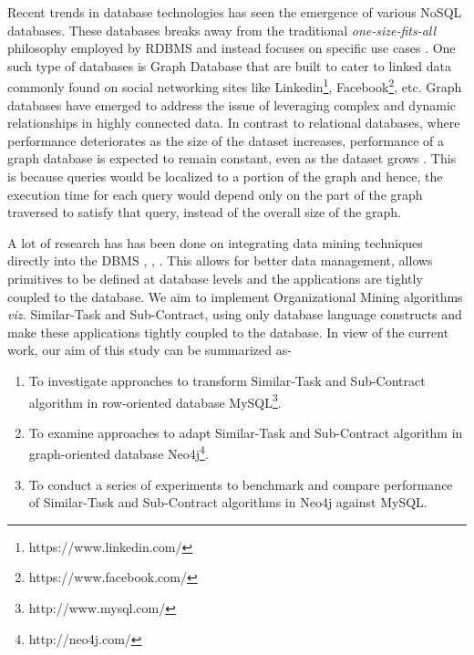 \documentclass[11pt]{article}
\begin{document}
\par{Recent trends in database technologies has seen the emergence of various NoSQL databases. These databases breaks away from the traditional \textit{one-size-fits-all} philosophy employed by RDBMS and instead focuses on specific use cases \cite{one}. One such type of databases is Graph Database that are built to cater to linked data commonly found on social networking sites like Linkedin\footnote{https://www.linkedin.com/}, Facebook\footnote{https://www.facebook.com/}, etc. Graph databases have emerged to address the issue of leveraging complex and dynamic relationships in highly connected data. In contrast to relational databases, where performance deteriorates as the size of the dataset increases, performance of a graph database is expected to remain constant, even as the dataset grows \cite{graphbook}. This is because queries would be localized to a portion of the graph and hence, the execution time for each query would depend only on the part of the graph traversed to satisfy that query, instead of the overall size of the graph.}
\par{A lot of research has has been done on integrating data mining techniques directly into the DBMS \cite{ordonez2004}, \cite{ordonezc}, \cite{ordonezmcmc}. This allows for better data management, allows primitives to be defined at database levels and the applications are tightly coupled to the database. We aim to implement Organizational Mining algorithms \textit{viz.} Similar-Task and Sub-Contract, using only database language constructs and make these applications tightly coupled to the database. In view of the current work, our aim of this study can be summarized as-}
\begin{enumerate}
\item To investigate approaches to transform Similar-Task and Sub-Contract algorithm in row-oriented database MySQL\footnote{http://www.mysql.com/}.
\item To examine approaches to adapt Similar-Task and Sub-Contract algorithm in graph-oriented database Neo4j\footnote{http://neo4j.com/}.
\item To conduct a series of experiments to benchmark and compare performance of Similar-Task and Sub-Contract algorithms in Neo4j against MySQL.
\end{enumerate}

%
\end{document}

